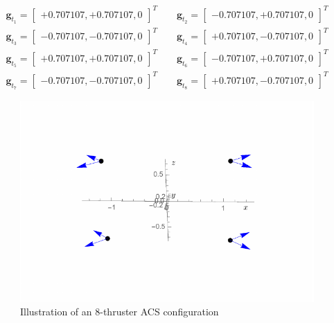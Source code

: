 \documentclass[]{BasiliskReportMemo}
\begin{document}
\begin{gather*}
	\label{eq:th:gt}
	\bm g_{t_{1}} = \begin{bmatrix} +0.707107, +0.707107, 0  \end{bmatrix}^{T}
	\quad\quad
	\bm g_{t_{2}} = \begin{bmatrix} -0.707107, +0.707107, 0  \end{bmatrix}^{T}
	\\
	\bm g_{t_{3}} = \begin{bmatrix} -0.707107, -0.707107, 0  \end{bmatrix}^{T}
	\quad\quad
	\bm g_{t_{4}} = \begin{bmatrix} +0.707107, -0.707107, 0  \end{bmatrix}^{T}
	\\
	\bm g_{t_{5}} = \begin{bmatrix} +0.707107, +0.707107, 0 \end{bmatrix}^{T}
	\quad\quad
	\bm g_{t_{6}} = \begin{bmatrix} -0.707107, +0.707107, 0  \end{bmatrix}^{T}
	\\
	\bm g_{t_{7}} = \begin{bmatrix} -0.707107, -0.707107, 0  \end{bmatrix}^{T}
	\quad\quad
	\bm g_{t_{8}} = \begin{bmatrix} +0.707107, -0.707107, 0  \end{bmatrix}^{T}
\end{gather*}
\begin{figure}[htb]
	\centerline{
	\includegraphics[]{Figures/8ThrConfig}
	}
	\caption{Illustration of an 8-thruster ACS configuration}
	\label{fig:8ThrConfig}
\end{figure}
\end{document}
